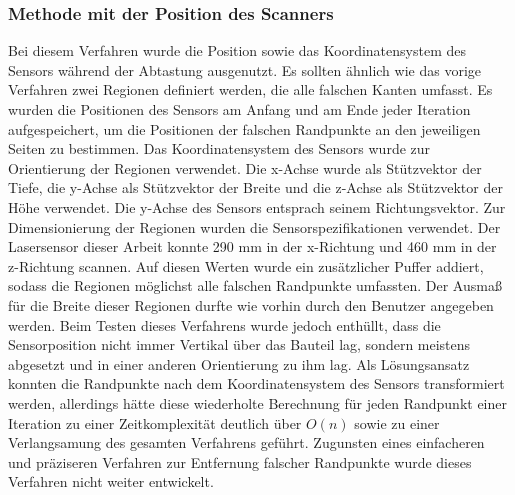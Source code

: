 \subsubsection{Methode mit der Position des Scanners}
Bei diesem Verfahren wurde die Position sowie das Koordinatensystem des Sensors während der Abtastung ausgenutzt. Es sollten ähnlich wie das vorige Verfahren zwei Regionen definiert werden, die alle falschen Kanten umfasst. Es wurden die Positionen des Sensors am Anfang und am Ende jeder Iteration aufgespeichert, um die Positionen der falschen Randpunkte an den jeweiligen Seiten zu bestimmen. Das Koordinatensystem des Sensors wurde zur Orientierung der Regionen verwendet. Die x-Achse wurde als Stützvektor der Tiefe, die y-Achse als Stützvektor der Breite und die z-Achse als Stützvektor der Höhe verwendet. Die y-Achse des Sensors entsprach seinem Richtungsvektor. Zur Dimensionierung der Regionen wurden die Sensorspezifikationen verwendet. Der Lasersensor dieser Arbeit konnte 290 mm in der x-Richtung und 460 mm in der z-Richtung scannen. Auf diesen Werten wurde ein zusätzlicher Puffer addiert, sodass die Regionen möglichst alle falschen Randpunkte umfassten. Der Ausmaß für die Breite dieser Regionen durfte wie vorhin durch den Benutzer angegeben werden. Beim Testen dieses Verfahrens wurde jedoch enthüllt, dass die Sensorposition nicht immer Vertikal über das Bauteil lag, sondern meistens abgesetzt und in einer anderen Orientierung zu ihm lag. Als Lösungsansatz konnten die Randpunkte nach dem Koordinatensystem des Sensors transformiert werden, allerdings hätte diese wiederholte Berechnung für jeden Randpunkt einer Iteration zu einer Zeitkomplexität deutlich über $O(n)$ sowie zu einer Verlangsamung des gesamten Verfahrens geführt. Zugunsten eines einfacheren und präziseren Verfahren zur Entfernung falscher Randpunkte wurde dieses Verfahren nicht weiter entwickelt.

